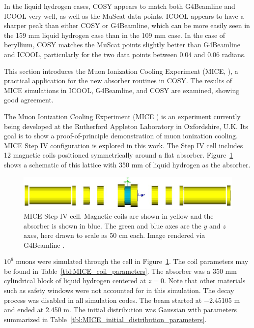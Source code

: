 In the liquid hydrogen cases, COSY appears to match both G4Beamline and ICOOL very well, as well as the MuScat data points. ICOOL appears to have a sharper peak than either COSY or G4Beamline, which can be more easily seen in the 159 mm liquid hydrogen case than in the 109 mm case. In the case of beryllium, COSY matches the MuScat points slightly better than G4Beamline and ICOOL, particularly for the two data points between 0.04 and 0.06 radians.

\label{sec:mice}

This section introduces the Muon Ionization Cooling Experiment (MICE, \cite{mice}), a practical application for the new absorber routines in COSY. The results of MICE simulations in ICOOL, G4Beamline, and COSY are examined, showing good agreement.

\label{ssc:miceIntro}
The Muon Ionization Cooling Experiment (MICE \cite{mice}) is an experiment currently being developed at the Rutherford Appleton Laboratory in Oxfordshire, U.K. Its goal is to show a proof-of-principle demonstration of muon ionization cooling. MICE Step IV configuration is explored in this work. The Step IV cell includes 12 magnetic coils positioned symmetrically around a flat absorber. Figure~\ref{fig:miceStepIV} shows a schematic of this lattice with 350 mm of liquid hydrogen as the absorber.
\begin{figure}[h!]
  \centering
    \includegraphics[width=\textwidth]{Figures/miceStepIV} 
  \caption[MICE Step IV cell.]{MICE Step IV cell. Magnetic coils are shown in yellow and the absorber is shown in blue. The green and blue axes are the $y$ and $z$ axes, here drawn to scale as 50 cm each. Image rendered via G4Beamline \cite{g4bl}.}
  \label{fig:miceStepIV}
\end{figure}

\label{ssc:miceResults}
$10^6$ muons were simulated through the cell in Figure~\ref{fig:miceStepIV}. The coil parameters may be found in Table~\ref{tbl:MICE_coil_parameters}. The absorber was a 350 mm cylindrical block of liquid hydrogen centered at $z=0$. Note that other materials such as safety windows were not accounted for in this simulation. The decay process was disabled in all simulation codes. The beam started at $-$2.45105 m and ended at 2.450 m. The initial distribution was Gaussian with parameters summarized in Table~\ref{tbl:MICE_initial_distribution_parameters}.

